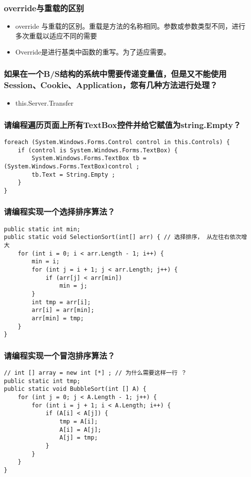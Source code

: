 \documentclass[9pt, b5paper]{article}
\begin{document}
\subsubsection{override与重载的区别}
\label{sec-1-1-5}
\begin{itemize}
\item override 与重载的区别。重载是方法的名称相同。参数或参数类型不同，进行多次重载以适应不同的需要
\item Override是进行基类中函数的重写。为了适应需要。
\end{itemize}
\subsubsection{如果在一个B/S结构的系统中需要传递变量值，但是又不能使用Session、Cookie、Application，您有几种方法进行处理？}
\label{sec-1-1-6}
\begin{itemize}
\item this.Server.Transfer
\end{itemize}
\subsubsection{请编程遍历页面上所有TextBox控件并给它赋值为string.Empty？}
\label{sec-1-1-7}
\begin{verbatim}
foreach (System.Windows.Forms.Control control in this.Controls) {
    if (control is System.Windows.Forms.TextBox) {
        System.Windows.Forms.TextBox tb = (System.Windows.Forms.TextBox)control ; 
        tb.Text = String.Empty ;
    }
}
\end{verbatim}
\subsubsection{请编程实现一个选择排序算法？}
\label{sec-1-1-8}
\begin{verbatim}
public static int min;
public static void SelectionSort(int[] arr) { // 选择排序， 从左往右依次增大
    for (int i = 0; i < arr.Length - 1; i++) {
        min = i;
        for (int j = i + 1; j < arr.Length; j++) {
            if (arr[j] < arr[min])
                min = j;
        }
        int tmp = arr[i];
        arr[i] = arr[min];
        arr[min] = tmp;
    }
}
\end{verbatim}
\subsubsection{请编程实现一个冒泡排序算法？}
\label{sec-1-1-9}
\begin{verbatim}
// int [] array = new int [*] ; // 为什么需要这样一行 ？
public static int tmp;
public static void BubbleSort(int [] A) {
    for (int j = 0; j < A.Length - 1; j++) {
        for (int i = j + 1; i < A.Length; i++) {
            if (A[i] < A[j]) {
                tmp = A[i];
                A[i] = A[j];
                A[j] = tmp;
            }
        }
    }
}
\end{verbatim}
\end{document}
